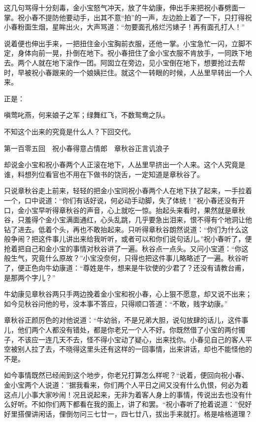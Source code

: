 \documentclass[12pt,UTF8]{ctexbook}
\begin{document}
{{{这几句骂得十分刻毒，金小宝怒气冲天，放了牛幼康，伸出手来把祝小春劈面一掌。祝小春不提防他要动手，出其不意“拍”的一声，左边脸上着了一下，只打得祝小春粉面生烟，星眸出火，大声骂道：“勿要面孔格烂污婊子！再有面孔打人！”

说着便也伸出手来，一把扭住金小宝胸前衣服，还他一掌。小宝急忙一闪，立脚不定，身体向前一晃，扑倒在地下。祝小春扭住了金小宝衣服不肯放手，一同跌下地去。两个人就在地下滚作一团。阿囡立在旁边，见小宝倒在地下，想要抢过去帮时，早被祝小春跟来的一个娘姨拦住。就这个一转眼的时候，人丛里早转出一个人来。

正是：

嗔莺叱燕，何来娘子之军；绿舞红飞，不数鸳鸯之队。

不知这个出来的究竟是什么人？下回交代。





第一百零五回　祝小春得意占情郎　章秋谷正言讥浪子





却说金小宝和祝小春两个人正滚在地下，人丛里早挤出一个人来。这个人究竟是谁，料想列位看官也不用在下做书的饶舌，一定知道是章秋谷了。

只说章秋谷走上前来，轻轻的把金小宝同祝小春两个人在地下扶了起来，一手拉着一个，口中说道：“你们有话好说，何必动手动脚，失了体统！”祝小春还没有开口，金小宝早听得章秋谷的声音，心上就吃一惊。抬起头来看时，果然就是章秋谷，只羞得个金小宝满面通红，心头乱跳，几乎要急出泪来，恨不得有个地洞让他钻了进去。低着个头，再也不敢抬起来。只听得章秋谷朗然说道：“你们为什么这般争闹？把这件事儿讲出来给我听听，或者可以和你们说句话儿。”祝小春听了，便抢着把自己和金小宝的事情对秋谷讲了一遍。秋谷点一点头。又问小宝道：“你这般生气，究竟什么原故？”小宝没奈何，只得也把这件事儿略略述了一遍。秋谷听了，便正色向牛幼康道：“尊姓是牛，想来是牛钦使的少君了？还没有请教台甫，是那两个字儿？”

牛幼康见章秋谷两只手两边挽着金小宝和祝小春，心上狠不愿意，却又说不出来；如今见秋谷问他的号，没本事不答应，只得顺口答道：“不敢，贱字幼康。”

章秋谷正颜厉色的对他说道：“牛幼翁，不是兄弟大胆，说句放肆的话儿，这件事儿，他们两个人都没有错处，都是你老兄一个人不好。你既然借了小宝的两付镯子，不该应一连几天不去，怪不得小宝动了疑心，出来找你。小春见自己的客人平空被别人拉了去，不晓得这里头还有这样的一回事情，出来讲话，却也不能怪他的不是。

如今事情既然已经闹到这个地步，你老兄打算怎么样呢？“说着，便回向祝小春、金小宝两个人说道：”据我看来，你们两个人平日之间又没有什么仇恨，何必为着这点儿小事大家吵闹！况且说起来，无非为着客人身上的事情，传说出去也没有什么好听。不如你们两下都看在我的面上，讲了和罢。“祝小春听了抢着说道：”倪好好里搭俚讲闲话，俚倒勿问三七廿一，四七廿八，拔出手来就打。格是啥格道理？

}}}
\end{document}
